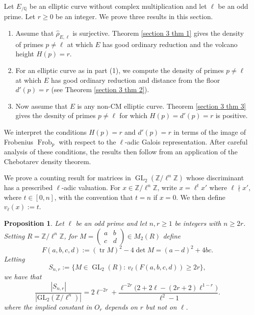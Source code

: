 \documentclass[table]{amsart}
\newtheorem{proposition}[theorem]{Proposition}
\newcommand{\tr}{\operatorname{tr}}
\newcommand{\Z}{\mathbb{Z}}
\newcommand{\Q}{\mathbb{Q}}
\newcommand{\op}[1]{\operatorname{#1}}
\numberwithin{equation}{section}
\begin{document}
\par Let $E_{/\Q}$ be an elliptic curve without complex multiplication and let $\ell$ be an odd prime. Let $r\geq 0$ be an integer. We prove three results in this section.
\begin{enumerate}
    \item Assume that $\widehat{\rho}_{E, \ell}$ is surjective. Theorem \ref{section 3 thm 1} gives the density of primes $p\neq \ell$ at which $E$ has good ordinary reduction and the volcano height $H(p)=r$. 
    \item For an elliptic curve as in part (1), we compute the density of primes $p\neq \ell$ at which $E$ has good ordinary reduction and distance from the floor $d'(p)=r$ (see Theorem \ref{section 3 thm 2}).
    \item Now assume that $E$ is any non-CM elliptic curve. Theorem \ref{section 3 thm 3} gives the desnity of primes $p\neq \ell$ for which $H(p)=d'(p)=r$ is positive.
\end{enumerate}
\noindent We interpret the conditions $H(p)=r$ and $d'(p)=r$ in terms of the image of Frobenius $\op{Frob}_p$ with respect to the $\ell$-adic Galois representation. After careful analysis of these conditions, the results then follow from an application of the Chebotarev density theorem.
\par We prove a counting result for matrices in $\op{GL}_2(\Z/\ell^n\Z)$ whose discriminant has a prescribed $\ell$-adic valuation. For $x\in \Z/\ell^n \Z$, write $x=\ell^t x'$ where $\ell\nmid x'$, where $t\in [0, n]$, with the convention that $t=n$ if $x=0$. We then define $v_\ell(x):=t$.
\begin{proposition}\label{section 3 main prop}
Let $\ell$ be an odd prime and let $n,r\geq 1$ be integers with $n\ge 2r$. Setting
$R=\Z/\ell^n\Z$, for $M=\begin{pmatrix}a&b\\ c&d\end{pmatrix}\in M_2(R)$ define
\[F(a,b,c,d):=(\tr M)^2-4\det M=(a-d)^2+4bc.
\]
Letting
\[
S_{n,r}:=\{M\in\op{GL}_2(R):\,v_\ell(F(a,b,c,d))\ge 2r\},
\]
we have that
\begin{equation}\label{S n r density}
\frac{|S_{n,r}|}{|\mathrm{GL}_2(\mathbb{Z}/\ell^n)|} 
= 2\ell^{-2r}
+
\frac{\ell^{-2r}\big(2+2\ell-(2r+2)\ell^{1-r}\big)}{\ell^{2}-1}.
\end{equation}
where the implied constant in $O_r$ depends on $r$ but not on $\ell$.
\end{proposition}
\end{document}
